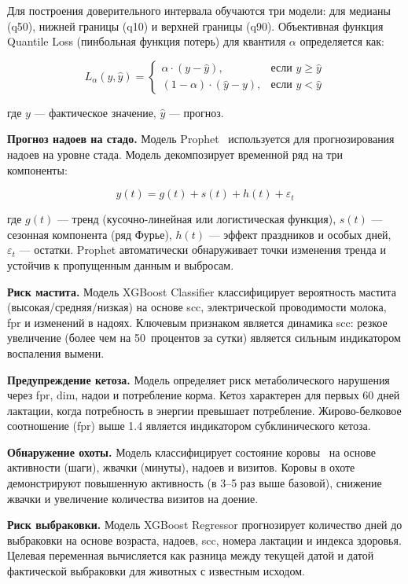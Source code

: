 Для построения доверительного интервала обучаются три модели: для медианы (q50), нижней границы (q10) и верхней границы (q90). Объективная функция Quantile Loss (пинбольная функция потерь) для квантиля $\alpha$ определяется как:

$$L_\alpha(y, \hat{y}) = \begin{cases} \alpha \cdot (y - \hat{y}), & \text{если } y \geq \hat{y} \\ (1 - \alpha) \cdot (\hat{y} - y), & \text{если } y < \hat{y} \end{cases}$$

где $y$ --- фактическое значение, $\hat{y}$ --- прогноз.

\textbf{Прогноз надоев на стадо.} Модель Prophet~\cite{Prophet} используется для прогнозирования надоев на уровне стада. Модель декомпозирует временной ряд на три компоненты:

$$y(t) = g(t) + s(t) + h(t) + \varepsilon_t$$

где $g(t)$ --- тренд (кусочно-линейная или логистическая функция), $s(t)$ --- сезонная компонента (ряд Фурье), $h(t)$ --- эффект праздников и особых дней, $\varepsilon_t$ --- остатки. Prophet автоматически обнаруживает точки изменения тренда и устойчив к пропущенным данным и выбросам.

\textbf{Риск мастита.} Модель XGBoost Classifier классифицирует вероятность мастита~\cite{MastitisDetection} (высокая/средняя/низкая) на основе \acrshort{scc}, электрической проводимости молока, \acrshort{fpr} и изменений в надоях. Ключевым признаком является динамика \acrshort{scc}: резкое увеличение (более чем на 50~процентов за сутки) является сильным индикатором воспаления вымени.

\textbf{Предупреждение кетоза.} Модель определяет риск метаболического нарушения через \acrshort{fpr}, \acrshort{dim}, надои и потребление корма. Кетоз характерен для первых 60 дней лактации, когда потребность в энергии превышает потребление. Жирово-белковое соотношение (\acrshort{fpr}) выше 1.4 является индикатором субклинического кетоза.

\textbf{Обнаружение охоты.} Модель классифицирует состояние коровы~\cite{PrecisionLivestock} на основе активности (шаги), жвачки (минуты), надоев и визитов. Коровы в охоте демонстрируют повышенную активность (в 3--5 раз выше базовой), снижение жвачки и увеличение количества визитов на доение.

\textbf{Риск выбраковки.} Модель XGBoost Regressor прогнозирует количество дней до выбраковки на основе возраста, надоев, \acrshort{scc}, номера лактации и индекса здоровья. Целевая переменная вычисляется как разница между текущей датой и датой фактической выбраковки для животных с известным исходом.


